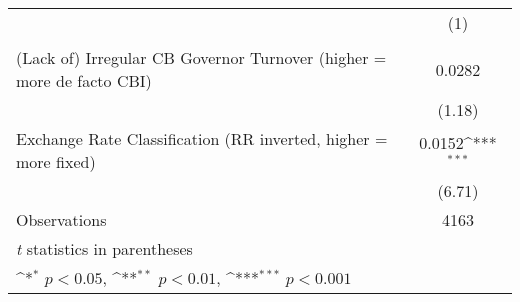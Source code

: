 {
\def\sym#1{\ifmmode^{#1}\else\(^{#1}\)\fi}
\begin{tabular}{l*{1}{c}}
\hline\hline
                &\multicolumn{1}{c}{(1)}\\
                &\multicolumn{1}{c}{}\\
\hline
(Lack of) Irregular CB Governor Turnover (higher = more de facto CBI)&   0.0282         \\
                &   (1.18)         \\
[1em]
Exchange Rate Classification (RR inverted, higher = more fixed)&   0.0152\sym{***}\\
                &   (6.71)         \\
\hline
Observations    &     4163         \\
\hline\hline
\multicolumn{2}{l}{\footnotesize \textit{t} statistics in parentheses}\\
\multicolumn{2}{l}{\footnotesize \sym{*} \(p<0.05\), \sym{**} \(p<0.01\), \sym{***} \(p<0.001\)}\\
\end{tabular}
}
